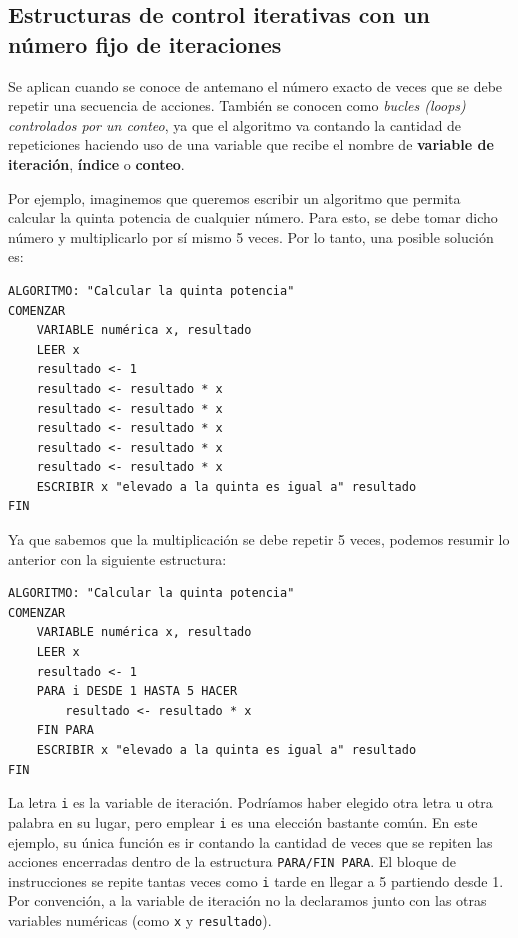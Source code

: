 \documentclass[
]{book}
\begin{document}
\hypertarget{estructuras-de-control-iterativas-con-un-nuxfamero-fijo-de-iteraciones}{%
\subsection{Estructuras de control iterativas con un número fijo de iteraciones}\label{estructuras-de-control-iterativas-con-un-nuxfamero-fijo-de-iteraciones}}

Se aplican cuando se conoce de antemano el número exacto de veces que se debe repetir una secuencia de acciones. También se conocen como \emph{bucles (loops) controlados por un conteo}, ya que el algoritmo va contando la cantidad de repeticiones haciendo uso de una variable que recibe el nombre de \textbf{variable de iteración}, \textbf{índice} o \textbf{conteo}.

Por ejemplo, imaginemos que queremos escribir un algoritmo que permita calcular la quinta potencia de cualquier número. Para esto, se debe tomar dicho número y multiplicarlo por sí mismo 5 veces. Por lo tanto, una posible solución es:

\begin{verbatim}
ALGORITMO: "Calcular la quinta potencia"
COMENZAR
    VARIABLE numérica x, resultado
    LEER x
    resultado <- 1
    resultado <- resultado * x
    resultado <- resultado * x
    resultado <- resultado * x
    resultado <- resultado * x
    resultado <- resultado * x
    ESCRIBIR x "elevado a la quinta es igual a" resultado
FIN
\end{verbatim}

Ya que sabemos que la multiplicación se debe repetir 5 veces, podemos resumir lo anterior con la siguiente estructura:

\begin{verbatim}
ALGORITMO: "Calcular la quinta potencia"
COMENZAR
    VARIABLE numérica x, resultado
    LEER x
    resultado <- 1
    PARA i DESDE 1 HASTA 5 HACER
        resultado <- resultado * x
    FIN PARA
    ESCRIBIR x "elevado a la quinta es igual a" resultado
FIN
\end{verbatim}

La letra \texttt{i} es la variable de iteración. Podríamos haber elegido otra letra u otra palabra en su lugar, pero emplear \texttt{i} es una elección bastante común. En este ejemplo, su única función es ir contando la cantidad de veces que se repiten las acciones encerradas dentro de la estructura \texttt{PARA/FIN\ PARA}. El bloque de instrucciones se repite tantas veces como \texttt{i} tarde en llegar a 5 partiendo desde 1. Por convención, a la variable de iteración no la declaramos junto con las otras variables numéricas (como \texttt{x} y \texttt{resultado}).
\end{document}
